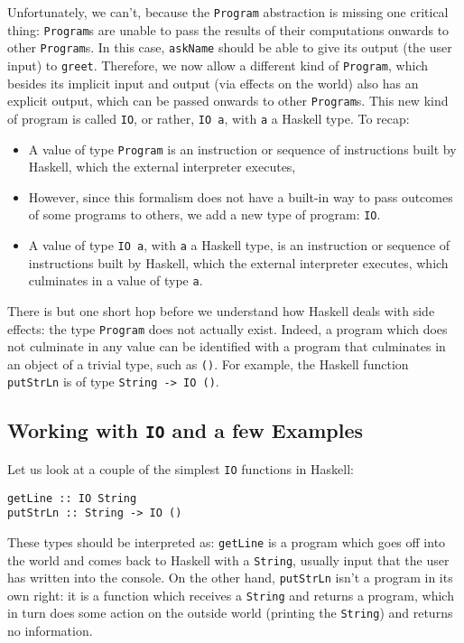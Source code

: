 \documentclass[11	pt]{article}
\theoremstyle{nonumberplain}
\newcommand*\lsin{\lstinline}
\begin{document}
Unfortunately, we can't, because the \lsin|Program| abstraction is missing one critical thing: \lsin|Program|s are unable to pass the results of their computations onwards to other \lsin|Program|s. In this case, \lsin|askName| should be able to give its output (the user input) to \lsin|greet|. Therefore, we now allow a different kind of \lsin|Program|, which besides its implicit input and output (via effects on the world) also has an explicit output, which can be passed onwards to other \lsin|Program|s. This new kind of program is called \lsin|IO|, or rather, \lsin|IO a|, with \lsin|a| a Haskell type. To recap:
\begin{itemize}
\item A value of type \lsin|Program| is an instruction or sequence of instructions built by Haskell, which the external interpreter executes,
\item However, since this formalism does not have a built-in way to pass outcomes of some programs to others, we add a new type of program: \lsin|IO|.
\item A value of type \lsin|IO a|, with \lsin|a| a Haskell type, is an instruction or sequence of instructions built by Haskell, which the external interpreter executes, which culminates in a value of type \lsin|a|.
\end{itemize}

There is but one short hop before we understand how Haskell deals with side effects: the type \lsin|Program| does not actually exist. Indeed, a program which does not culminate in any value can be identified with a program that culminates in an object of a trivial type, such as \lsin|()|. For example, the Haskell function \lsin|putStrLn| is of type \lsin|String -> IO ()|.

\subsection{Working with \texorpdfstring{\texttt{IO}}{IO} and a few Examples}

Let us look at a couple of the simplest \lsin|IO| functions in Haskell:
\begin{lstlisting}
getLine :: IO String
putStrLn :: String -> IO ()
\end{lstlisting}

These types should be interpreted as: \lsin|getLine| is a program which goes off into the world and comes back to Haskell with a \lsin|String|, usually input that the user has written into the console. On the other hand, \lsin|putStrLn| isn't a program in its own right: it is a function which receives a \lsin|String| and returns a program, which in turn does some action on the outside world (printing the \lsin|String|) and returns no information.
\end{document}
